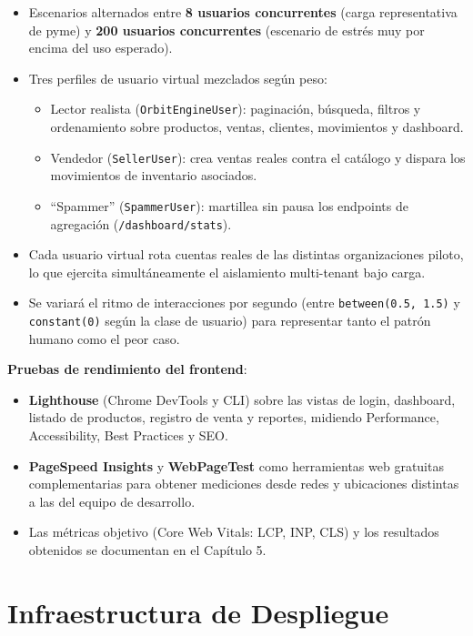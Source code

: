 \begin{itemize}
\tightlist
\item
  Escenarios alternados entre \textbf{8 usuarios concurrentes} (carga representativa de pyme) y \textbf{200 usuarios concurrentes} (escenario de estrés muy por encima del uso esperado).
\item
  Tres perfiles de usuario virtual mezclados según peso:

  \begin{itemize}
  \tightlist
  \item
    Lector realista (\texttt{OrbitEngineUser}): paginación, búsqueda, filtros y ordenamiento sobre productos, ventas, clientes, movimientos y dashboard.
  \item
    Vendedor (\texttt{SellerUser}): crea ventas reales contra el catálogo y dispara los movimientos de inventario asociados.
  \item
    ``Spammer'' (\texttt{SpammerUser}): martillea sin pausa los endpoints de agregación (\texttt{/dashboard/stats}).
  \end{itemize}
\item
  Cada usuario virtual rota cuentas reales de las distintas organizaciones piloto, lo que ejercita simultáneamente el aislamiento multi-tenant bajo carga.
\item
  Se variará el ritmo de interacciones por segundo (entre \texttt{between(0.5,\ 1.5)} y \texttt{constant(0)} según la clase de usuario) para representar tanto el patrón humano como el peor caso.
\end{itemize}

\textbf{Pruebas de rendimiento del frontend}:

\begin{itemize}
\tightlist
\item
  \textbf{Lighthouse} (Chrome DevTools y CLI) sobre las vistas de login, dashboard, listado de productos, registro de venta y reportes, midiendo Performance, Accessibility, Best Practices y SEO.
\item
  \textbf{PageSpeed Insights} y \textbf{WebPageTest} como herramientas web gratuitas complementarias para obtener mediciones desde redes y ubicaciones distintas a las del equipo de desarrollo.
\item
  Las métricas objetivo (Core Web Vitals: LCP, INP, CLS) y los resultados obtenidos se documentan en el Capítulo 5.
\end{itemize}

\section{Infraestructura de Despliegue}\label{infraestructura-de-despliegue}

